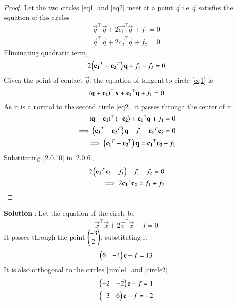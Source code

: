 \documentclass[journal,12pt,twocolumn]{IEEEtran}
\begin{document}
\begin{proof}
Let the two circles \eqref{eq1} and \eqref{eq2} meet at a point $\vec{q}$ i.e $\vec{q}$ satisfies the equation of the circles
\begin{align}
    \vec{q}^\top\vec{q} + 2\vec{c_1}^\top\vec{q} + f_1 = 0 \label{2.0.4}\\
    \vec{q}^\top\vec{q} + 2\vec{c_2}^\top\vec{q} + f_2 = 0 \label{2.0.5}
\end{align}
Eliminating quadratic term,
\begin{align}
    2\left(\mathbf{c_1}^T - \mathbf{c_2}^T\right)\mathbf{q} + f_1 - f_2 = 0 \label{2.0.6}
\end{align}
Given the point of contact $\vec{q}$, the equation of tangent to circle \eqref{eq1} is
\begin{align}
    \left(\mathbf{q}+\mathbf{c_1}\right)^\top\mathbf{x} + \mathbf{c_1}^\top\mathbf{q} + f_1 = 0 
\end{align}
As it is a normal to the second circle \eqref{eq2}, it passes through the center of it
\begin{align}
    \left(\mathbf{q}+\mathbf{c_1}\right)^\top\left(\mathbf{-c_2}\right) + \mathbf{c_1}^\top\mathbf{q} + f_1 = 0 \\
    \implies \left(\mathbf{c_1}^T - \mathbf{c_2}^T\right)\mathbf{q} + f_1 - \mathbf{c_1}^T\mathbf{c_2} = 0 \\
    \implies \left(\mathbf{c_1}^T - \mathbf{c_2}^T\right)\mathbf{q} = \mathbf{c_1}^T\mathbf{c_2} - f_1
    \label{2.0.10}
\end{align}
Substituting \eqref{2.0.10} in \eqref{2.0.6},
\begin{align}
    2\left(\mathbf{c_1}^T\mathbf{c_2} - f_1\right)  + f_1 - f_2 = 0 \\
    \implies 2\mathbf{c_1}^\top\mathbf{c_2} = f_1 + f_2 
\end{align}
\end{proof}
\textbf{Solution} : Let the equation of the circle be
\begin{align}
    \vec{x}^\top\vec{x} + 2\vec{c}^\top\vec{x} + f = 0
\end{align}
It passes through the point $\begin{pmatrix}-3\\2\end{pmatrix}$, substituting it
\begin{align}
    \begin{pmatrix}6&-4\end{pmatrix}\mathbf{c} - f = 13  
\end{align}
It is also orthogonal to the circles \eqref{circle1} and \eqref{circle2}
\begin{align}
    \begin{pmatrix}-2&-2\end{pmatrix}\mathbf{c} - f = 1\\
    \begin{pmatrix}-3&6\end{pmatrix}\mathbf{c} - f = -2
\end{align}
\end{document}
